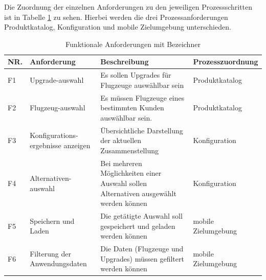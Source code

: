 Die Zuordnung der einzelnen Anforderungen zu den jeweiligen Prozessschritten ist in Tabelle \ref{functionalRequirements} zu sehen. Hierbei werden die drei Prozessanforderungen Produktkatalog, Konfiguration und mobile Zielumgebung unterschieden.
\par 
\begin{table}

\begin{tabular}[H]{| p{0.4cm} | p{2.5cm} | p{5.9cm} | p{4.5cm} |}
\toprule[2pt] \rowcolor{dunkelgrau}
\hline
  NR. & Anforderung & Beschreibung & Prozesszuordnung \\
  \hline
  F1 & Upgrade-auswahl & Es sollen Upgrades für Flugzeuge auswählbar sein & Produktkatalog
   \\
  \hline
  F2 & Flugzeug-auswahl & Es müssen Flugzeuge eines bestimmten Kunden auswählbar sein. & Produktkatalog  \\
  \hline
    F3 & Konfigurations-ergebnisse anzeigen & Übersichtliche Darstellung der aktuellen Zusammenstellung & Konfiguration \\
    \hline
     F4 & Alternativen-auswahl & Bei mehreren Möglichkeiten einer Auswahl sollen Alternativen ausgewählt werden können & Konfiguration \\
        \hline
    F5 & Speichern und Laden & Die getätigte Auswahl soll gespeichert und geladen werden können& mobile Zielumgebung \\
    \hline
    F6 & Filterung der Anwendungsdaten & Die Daten (Flugzeuge und Upgrades) müssen gefiltert werden können & mobile Zielumgebung \\
    \hline
\bottomrule[2pt]
\end{tabular}
\caption{Funktionale Anforderungen mit Bezeichner}
\label{functionalRequirements}
\end{table}





